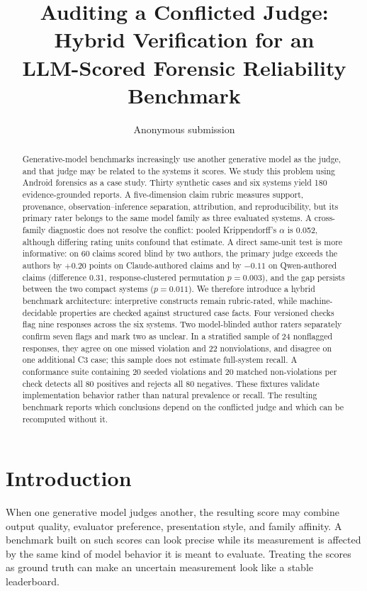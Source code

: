 \documentclass[conference]{IEEEtran}
\title{Auditing a Conflicted Judge: Hybrid Verification for an\\
LLM-Scored Forensic Reliability Benchmark}
\author{Anonymous submission}
\begin{document}
\maketitle

\begin{abstract}
Generative-model benchmarks increasingly use another generative model as the
judge, and that judge may be related to the systems it scores. We study this
problem using Android forensics as a case study. Thirty synthetic cases and six systems yield 180 evidence-grounded
reports. A five-dimension claim rubric measures support, provenance,
observation--inference separation, attribution, and reproducibility, but its
primary rater belongs to the same model family as three evaluated systems. A
cross-family diagnostic does not resolve the conflict: pooled Krippendorff's
$\alpha$ is 0.052, although differing rating units confound that estimate. A
direct same-unit test is more informative: on 60 claims scored blind by two
authors, the primary judge exceeds the authors by $+0.20$ points on
Claude-authored claims and by $-0.11$ on Qwen-authored claims (difference
0.31, response-clustered permutation $p=0.003$), and the gap persists between
the two compact systems ($p=0.011$). We
therefore introduce a hybrid benchmark architecture: interpretive constructs
remain rubric-rated, while machine-decidable properties are checked against
structured case facts. Four versioned checks flag nine responses across the six
systems. Two model-blinded author raters separately confirm seven flags and mark
two as unclear. In a stratified sample of 24 nonflagged responses, they agree on
one missed violation and 22 nonviolations, and disagree on one additional C3
case; this sample does
not estimate full-system recall. A conformance suite containing 20 seeded violations
and 20 matched non-violations per check detects all 80 positives and rejects all
80 negatives. These fixtures validate implementation behavior rather than
natural prevalence or recall. The resulting benchmark reports which conclusions
depend on the conflicted judge and which can be recomputed without it.
\end{abstract}

\section{Introduction}
When one generative model judges another, the resulting score may combine
output quality, evaluator preference, presentation style, and family affinity.
A benchmark built on such scores can look precise while its measurement is
affected by the same kind of model behavior it is meant to evaluate. Treating
the scores as ground truth can make an uncertain measurement look like a stable
leaderboard.
\end{document}
